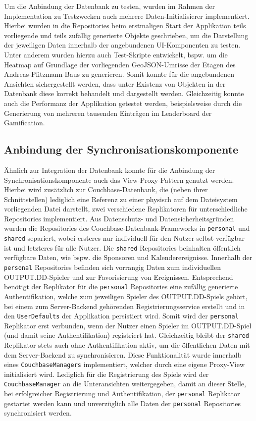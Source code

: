 Um die Anbindung der Datenbank zu testen, wurden im Rahmen der Implementation zu Testzwecken auch mehrere Daten-Initialisierer implementiert. Hierbei wurden in die Repositories beim erstmaligen Start der Applikation teils vorliegende und teils zufällig generierte Objekte geschrieben, um die Darstellung der jeweiligen Daten innerhalb der angebundenen UI-Komponenten zu testen. Unter anderem wurden hierzu auch Test-Skripte entwickelt, bspw. um die Heatmap auf Grundlage der vorliegenden GeoJSON-Umrisse der Etagen des Andreas-Pfitzmann-Baus zu generieren. Somit konnte für die angebundenen Ansichten sichergestellt werden, dass unter Existenz von Objekten in der Datenbank diese korrekt behandelt und dargestellt werden. Gleichzeitig konnte auch die Performanz der Applikation getestet werden, beispielsweise durch die Generierung von mehreren tausenden Einträgen im Leaderboard der Gamification.

\subsection{Anbindung der Synchronisationskomponente}

Ähnlich zur Integration der Datenbank konnte für die Anbindung der Synchronisationskomponente auch das View-Proxy-Pattern genutzt werden. Hierbei wird zusätzlich zur Couchbase-Datenbank, die (neben ihrer Schnittstellen) lediglich eine Referenz zu einer physisch auf dem Dateisystem vorliegenden Datei darstellt, zwei verschiedene Replikatoren für unterschiedliche Repositories implementiert. Aus Datenschutz- und Datensicherheitsgründen wurden die Repositories des Couchbase-Datenbank-Frameworks in \texttt{personal} und \texttt{shared} separiert, wobei ersteres nur individuell für den Nutzer selbst verfügbar ist und letzteres für alle Nutzer. Die \texttt{shared} Repositories beinhalten öffentlich verfügbare Daten, wie bspw. die Sponsoren und Kalenderereignisse. Innerhalb der \texttt{personal} Repositories befinden sich vorrangig Daten zum individuellen OUTPUT.DD-Spieler und zur Favorisierung von Ereignissen. Entsprechend benötigt der Replikator für die \texttt{personal} Repositories eine zufällig generierte Authentifikation, welche zum jeweiligen Spieler des OUTPUT.DD-Spiels gehört, bei einem zum Server-Backend gehörenden Registrierungsservice erstellt und in den \texttt{UserDefaults} der Applikation persistiert wird. Somit wird der \texttt{personal} Replikator erst verbunden, wenn der Nutzer einen Spieler im OUTPUT.DD-Spiel (und damit seine Authentifikation) registriert hat. Gleichzeitig bleibt der \texttt{shared} Replikator stets auch ohne Authentifikation aktiv, um die öffentlichen Daten mit dem Server-Backend zu synchronisieren. Diese Funktionalität wurde innerhalb eines \texttt{CouchbaseManagers} implementiert, welcher durch eine eigene Proxy-View initialisiert wird. Lediglich für die Registrierung des Spiels wird der \texttt{CouchbaseManager} an die Unteransichten weitergegeben, damit an dieser Stelle, bei erfolgreicher Registrierung und Authentifikation, der \texttt{personal} Replikator gestartet werden kann und unverzüglich alle Daten der \texttt{personal} Repositories synchronisiert werden.

